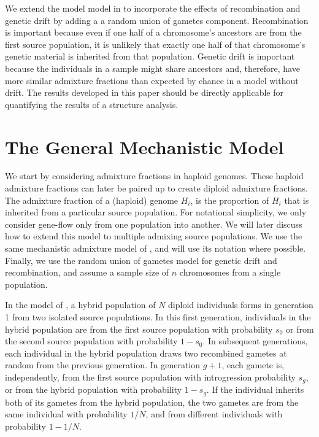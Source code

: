 \documentclass[11pt]{amsart}
\begin{document}
We extend the model model in \citet{verdu2011general} to incorporate the effects of recombination and genetic drift by adding a a random union of gametes component. Recombination is important because even if one half of a chromosome's ancestors are from the first source population, it is unlikely that exactly one half of that chromosome's genetic material is inherited from that population. Genetic drift is important because the individuals in a sample might share ancestors and, therefore, have more similar admixture fractions than expected by chance in a model without drift. The results developed in this paper should be directly applicable for quantifying the results of a structure analysis.

\section*{The General Mechanistic Model}
We start by considering admixture fractions in haploid genomes. These haploid admixture fractions can later be paired up to create diploid admixture fractions. The admixture fraction of a (haploid) genome $H_i$, is the proportion of $H_i$ that is inherited from a particular source population. For notational simplicity, we only consider gene-flow only from one population into another. We will later discuss how to extend this model to multiple admixing source populations. We use the same mechanistic admixture model of \citet{verdu2011general}, and will use its notation where possible. Finally, we use the random union of gametes model for genetic drift and recombination, and assume a sample size of $n$ chromosomes from a single population.

In the model of \citet{verdu2011general}, a hybrid population of $N$ diploid individuals forms in generation 1 from two isolated source populations. In this first generation, individuals in the hybrid population are from the first source population with probability $s_0$ or from the second source population with probability $1-s_0$. In subsequent generations, each individual in the hybrid population draws two recombined gametes at random from the previous generation. In generation $g+1$, each gamete is, independently, from the first source population with introgression probability $s_g$, or from the hybrid population with probability $1-s_g$. If the individual inherits both of its gametes from the hybrid population, the two gametes are from the same individual with probability $1/N$, and from different individuals with probability $1-1/N$. 
\end{document}
